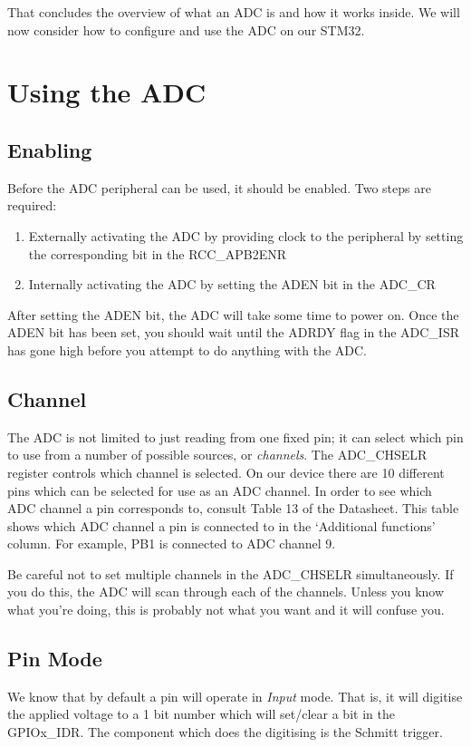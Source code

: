 That concludes the overview of what an ADC is and how it works inside. We will now consider how to configure and use the ADC on our STM32.

\section{Using the ADC}
\subsection{Enabling}
Before the ADC peripheral can be used, it should be enabled. Two steps are required: 
\begin{enumerate}
\item Externally activating the ADC by providing clock to the peripheral by setting the corresponding bit in the RCC\_APB2ENR
\item Internally activating the ADC by setting the ADEN bit in the ADC\_CR
\end{enumerate}

After setting the ADEN bit, the ADC will take some time to power on. Once the ADEN bit has been set, you should wait until the ADRDY flag in the ADC\_ISR has gone high before you attempt to do anything with the ADC. 

\subsection{Channel}
The ADC is not limited to just reading from one fixed pin; it can select which pin to use from a number of possible sources, or \emph{channels}.
The ADC\_CHSELR register controls which channel is selected. On our device there are 10 different pins which can be selected for use as an ADC channel. In order to see which ADC channel a pin corresponds to, consult Table 13 of the Datasheet. This table shows which ADC channel a pin is connected to in the `Additional functions' column. For example, PB1 is connected to ADC channel 9.

Be careful not to set multiple channels in the ADC\_CHSELR simultaneously. If you do this, the ADC will scan through each of the channels. Unless you know what you're doing, this is probably not what you want and it will confuse you.

\subsection{Pin Mode}
We know that by default a pin will operate in \emph{Input} mode. That is, it will digitise the applied voltage to a 1 bit number which will set/clear a bit in the GPIOx\_IDR. The component which does the digitising is the Schmitt trigger. 

